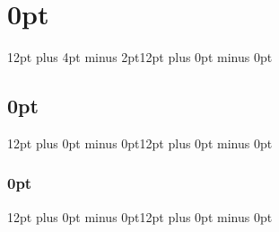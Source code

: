 \titlespacing\section{0pt}{12pt plus 4pt minus 2pt}{12pt plus 0pt minus 0pt}
\titlespacing\subsection{0pt}{12pt plus 0pt minus 0pt}{12pt plus 0pt minus 0pt}
\titlespacing\subsubsection{0pt}{12pt plus 0pt minus 0pt}{12pt plus 0pt minus 0pt}
\setcounter{section}{0}
\setcounter{footnote}{0}
\setcounter{figure}{0}
\setcounter{table}{0}
\setcounter{page}{1}

\onecolumn
\pagestyle{appendix}

\newcommand{\Appendixhead}{
\begin{center}
\LARGE\textbf{Technical Appendix}
\end{center}
}